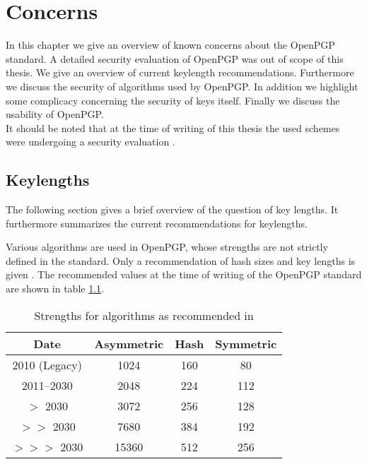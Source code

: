 \chapter{Concerns} \label{chapter:concerns}


In this chapter we give an overview of known concerns about the OpenPGP standard. A detailed security evaluation of OpenPGP was out of scope of this thesis. We give an overview of current keylength recommendations. Furthermore we discuss the security of algorithms used by OpenPGP. In addition we highlight some complicacy concerning the security of keys itself. Finally we discuss the usability of OpenPGP. \\

It should be noted that at the time of writing of this thesis the used schemes were undergoing a security evaluation \citep{TUB2015}.



\section{Keylengths}

The following section gives a brief overview of the question of key lengths. It furthermore summarizes the current recommendations for keylengths. 

Various algorithms are used in OpenPGP, whose strengths are not strictly defined in the standard. 
Only a recommendation of hash sizes and key lengths is given \citep[section 14]{RFC4880}.
The recommended values at the time of writing of the OpenPGP standard are shown in table \ref{tab:keylengths}.

\begin{table}[h]
	\centering
	\begin{tabular}{|c|c|c|c|}
		\hline Date & 			Asymmetric & Hash & Symmetric \\ 
		\hline\hline 2010 (Legacy) & 1024 & 160 & 80 \\ 
		\hline 2011--2030 & 2048 & 224 & 112 \\ 
		\hline $>$ 2030 		   & 3072 & 256 & 128 \\ 
		\hline $>>$ 2030       & 7680 & 384 & 192 \\ 
		\hline $>>>$ 2030     & 15360 & 512 & 256 \\ 
		\hline 
	\end{tabular}
	\caption{Strengths for algorithms as recommended in \citep[section 14]{RFC4880}} 
		\label{tab:keylengths}
\end{table}

